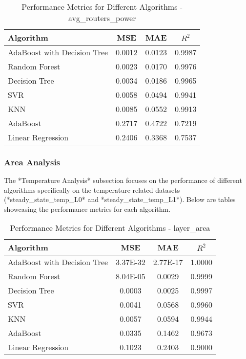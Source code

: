 \documentclass[conference]{IEEEtran}
\begin{document}
\begin{table}[ht]
	\centering
	\caption{Performance Metrics for Different Algorithms - avg\_routers\_power}
	\label{tab:avg_routers_power}
	\begin{tabular}{lccc}
		\toprule
		\textbf{Algorithm} & \textbf{MSE} & \textbf{MAE} & \textbf{\(R^2\)} \\
		\midrule
		AdaBoost with Decision Tree & 0.0012 & 0.0123 & 0.9987 \\
		Random Forest & 0.0023 & 0.0170 & 0.9976 \\
		Decision Tree & 0.0034 & 0.0186 & 0.9965 \\
		SVR & 0.0058 & 0.0494 & 0.9941 \\
		KNN & 0.0085 & 0.0552 & 0.9913 \\
		AdaBoost & 0.2717 & 0.4722 & 0.7219 \\
		Linear Regression & 0.2406 & 0.3368 & 0.7537 \\
		\bottomrule
	\end{tabular}
\end{table}



\subsubsection{Area Analysis}
The *Temperature Analysis* subsection focuses on the performance of different algorithms specifically on the temperature-related datasets (*steady\_state\_temp\_L0* and *steady\_state\_temp\_L1*). Below are tables showcasing the performance metrics for each algorithm.

\begin{table}[ht]
	\centering
	\caption{Performance Metrics for Different Algorithms - layer\_area}
	\label{tab:layer_area}
	\begin{tabular}{lccc}
		\toprule
		\textbf{Algorithm} & \textbf{MSE} & \textbf{MAE} & \textbf{\(R^2\)} \\
		\midrule
		AdaBoost with Decision Tree & 3.37E-32 & 2.77E-17 & 1.0000 \\
		Random Forest & 8.04E-05 & 0.0029 & 0.9999 \\
		Decision Tree & 0.0003 & 0.0025 & 0.9997 \\
		SVR & 0.0041 & 0.0568 & 0.9960 \\
		KNN & 0.0057 & 0.0594 & 0.9944 \\
		AdaBoost & 0.0335 & 0.1462 & 0.9673 \\
		Linear Regression & 0.1023 & 0.2403 & 0.9000 \\
		\bottomrule
	\end{tabular}
\end{table}
\end{document}
